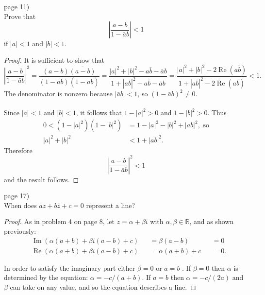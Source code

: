 \documentclass{article}
\newenvironment{problem}[2][Problem]{\begin{trivlist}
\item[\hskip \labelsep {\bfseries #1}\hskip \labelsep {\bfseries #2.}]}{\end{trivlist}}
\begin{document}
\pagebreak

\begin{problem}{1} (page 11) \\
  Prove that \[
    \left|\frac{a - b}{1 - \bar{a}b}\right| < 1
  \] if $|a| < 1$ and $|b| < 1$.
\end{problem}

\begin{proof}
  It is sufficient to show that \[
    \left|\frac{a - b}{1 - \bar{a}b}\right|^2
    = \frac{(a - b)\overline{(a - b)}}{(1 - \bar{a}b)(1 - a\bar{b})}
    = \frac{|a|^2 + |b|^2 - a\bar{b} - \bar{a}b}{1 + |a\bar{b}|^2 - a\bar{b} - \bar{a}b}
    = \frac{|a|^2 + |b|^2 - 2\operatorname{Re}(a\bar{b})}{1 + |a\bar{b}|^2 - 2\operatorname{Re}(a\bar{b})}
    < 1.
  \]
  The denominator is nonzero because $|\bar{a}b| < 1$,
  so $(1 - \bar{a}b)^2 \not= 0$.\\ \\
  Since $|a| < 1$ and $|b| < 1$, it follows that $1 - |a|^2 > 0$  and $1 - |b|^2 > 0$. Thus
  \begin{align*}
    0 < (1 - |a|^2)(1 - |b|^2) &= 1 - |a|^2 - |b|^2 + |ab|^2, \text { so} \\
    |a|^2 + |b|^2 &< 1 + |ab|^2.
  \end{align*} Therefore \[
    \left|\frac{a - b}{1 - \bar{a}b}\right|^2 < 1
  \] and the result follows.
\end{proof}

\pagebreak

\begin{problem}{1} (page 17) \\
  When does $az + b\bar{z} + c = 0$ represent a line?
\end{problem}

\begin{proof}
  As in problem 4 on page 8, let $z = \alpha + \beta i$ with
  $\alpha, \beta \in \mathbb{R}$, and as shown previously: \begin{align*}
    &\operatorname{Im}(\alpha(a + b) + \beta i(a - b) + c) &&= \beta(a - b)      &&= 0\\
    &\operatorname{Re}(\alpha(a + b) + \beta i(a - b) + c) &&= \alpha(a + b) + c &&= 0.
  \end{align*}

  In order to satisfy the imaginary part either $\beta = 0$ or $a = b$ .
  If $\beta = 0$ then $\alpha$ is determined by the equation: $\alpha = -c/(a + b)$.
  If $a = b$ then $\alpha = -c/(2a)$ and $\beta$ can take on any value, and so
  the equation describes a line.
\end{proof}
\end{document}

